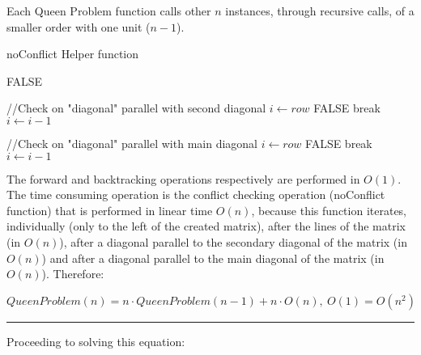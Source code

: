 Each Queen Problem function calls other $ n $ instances, through recursive calls, of a smaller order with one unit ($ n-1 $).


\begin{algorithm}[H]
\caption{noConflict Helper function}
\begin{algorithmic}[1]
			\State \Return FALSE
		\EndIf
	\EndFor
	
	
	//Check on "diagonal" parallel with second diagonal
	\State $i \gets row$
			\State \Return FALSE
		\EndIf
		\State break
	\EndIf
	\State $i \gets i-1$	
	\EndFor
	
	//Check on "diagonal" parallel with main diagonal
	\State $i \gets row$
			\State \Return FALSE
		\EndIf
		\State break
	\EndIf
	\State $i \gets i-1$	
	\EndFor

\EndProcedure

\end{algorithmic}
\end{algorithm}

The forward and backtracking operations respectively are performed in $ O (1) $. The time consuming operation is the conflict checking operation (noConflict function) that is performed in linear time $ O (n) $, because this function iterates, individually (only to the left of the created matrix), after the lines of the matrix (in $ O (n) $), after a diagonal parallel to the secondary diagonal of the matrix (in $ O (n) $) and after a diagonal parallel to the main diagonal of the matrix (in $ O (n) $).
Therefore:

$QueenProblem(n) = n \cdot QueenProblem(n-1) + n \cdot O(n),\ O(1)=O(n^2)$ \\ 
\noindent\rule{16cm}{0.4pt}
Proceeding to solving this equation:


